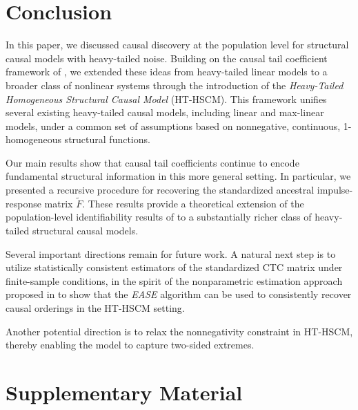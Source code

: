 \documentclass[10pt]{article}
\begin{document}
\section{Conclusion}

In this paper, we discussed causal discovery at the population level for structural causal models with heavy-tailed noise. Building on the causal tail coefficient framework of \cite{gnecco2021causal}, we extended these ideas from heavy-tailed linear models to a broader class of nonlinear systems through the introduction of the \emph{Heavy-Tailed Homogeneous Structural Causal Model} (HT-HSCM). This framework unifies several existing heavy-tailed causal models, including linear and max-linear models, under a common set of assumptions based on nonnegative, continuous, 1-homogeneous structural functions.

Our main results show that causal tail coefficients continue to encode fundamental structural information in this more general setting. In particular,  we presented a recursive procedure for recovering the standardized ancestral impulse-response matrix $\widetilde{F}$. These results provide a theoretical extension of the population-level identifiability results of \cite{gnecco2021causal} to a substantially richer class of heavy-tailed structural causal models.

Several important directions remain for future work. A natural next step is to utilize statistically consistent estimators of the standardized CTC matrix under finite-sample conditions, in the spirit of the nonparametric estimation approach proposed in \cite{gnecco2021causal} to show that the \textit{EASE} algorithm can be used to consistently recover causal orderings in the HT-HSCM setting. 


 Another potential direction is to relax the nonnegativity constraint in HT-HSCM, thereby enabling the model to capture two-sided extremes.
 

\nopagebreak


















\newpage

\section*{Supplementary Material}
\end{document}
